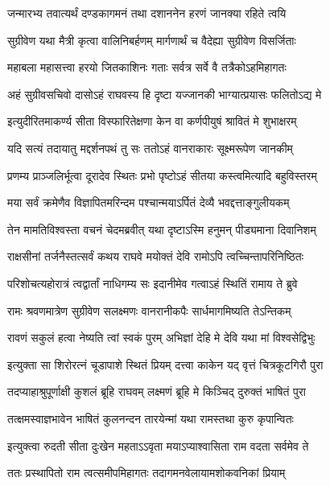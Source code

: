 \twolineshloka
{जन्मारभ्य तवात्यर्थं दण्डकागमनं तथा}
{दशाननेन हरणं जानक्या रहिते त्वयि} %

\twolineshloka
{सुग्रीवेण यथा मैत्री कृत्वा वालिनिबर्हणम्}
{मार्गणार्थं च वैदेह्या सुग्रीवेण विसर्जिताः} %

\twolineshloka
{महाबला महासत्त्वा हरयो जितकाशिनः}
{गताः सर्वत्र सर्वे वै तत्रैकोऽहमिहागतः} %

\twolineshloka
{अहं सुग्रीवसचिवो दासोऽहं राघवस्य हि}
{दृष्टा यज्जानकी भाग्यात्प्रयासः फलितोऽद्य मे} %

\twolineshloka
{इत्युदीरितमाकर्ण्य सीता विस्फारितेक्षणा}
{केन वा कर्णपीयुषं श्रावितं मे शुभाक्षरम्} %

\twolineshloka
{यदि सत्यं तदायातु मद्दर्शनपथं तु सः}
{ततोऽहं वानराकारः सूक्ष्मरूपेण जानकीम्} %

\twolineshloka
{प्रणम्य प्राञ्जलिर्भूत्वा दूरादेव स्थितः प्रभो}
{पृष्टोऽहं सीतया कस्त्वमित्यादि बहुविस्तरम्} %

\twolineshloka
{मया सर्वं क्रमेणैव विज्ञापितमरिन्दम}
{पश्चान्मयाऽर्पितं देव्यै भवद्दत्ताङ्गुलीयकम्} %

\twolineshloka
{तेन मामतिविश्वस्ता वचनं चेदमब्रवीत्}
{यथा दृष्टाऽस्मि हनुमन् पीड्यमाना दिवानिशम्} %

\twolineshloka
{राक्षसीनां तर्जनैस्तत्सर्वं कथय राघवे}
{मयोक्तं देवि रामोऽपि त्वच्चिन्तापरिनिष्ठितः} %

\twolineshloka
{परिशोचत्यहोरात्रं त्वद्वार्तां नाधिगम्य सः}
{इदानीमेव गत्वाऽहं स्थितिं रामाय ते ब्रुवे} %

\twolineshloka
{रामः श्रवणमात्रेण सुग्रीवेण सलक्ष्मणः}
{वानरानीकपैः सार्धमागमिष्यति तेऽन्तिकम्} %

\twolineshloka
{रावणं सकुलं हत्वा नेष्यति त्वां स्वकं पुरम्}
{अभिज्ञां देहि मे देवि यथा मां विश्वसेद्विभुः} %

\twolineshloka
{इत्युक्ता सा शिरोरत्नं चूडापाशे स्थितं प्रियम्}
{दत्त्वा काकेन यद् वृत्तं चित्रकूटगिरौ पुरा} %

\twolineshloka
{तदप्याहाश्रुपूर्णाक्षी कुशलं ब्रूहि राघवम्}
{लक्ष्मणं ब्रूहि मे किञ्चिद् दुरुक्तं भाषितं पुरा} %

\twolineshloka
{तत्क्षमस्वाज्ञभावेन भाषितं कुलनन्दन}
{तारयेन्मां यथा रामस्तथा कुरु कृपान्वितः} %

\twolineshloka
{इत्युक्त्वा रुदती सीता दुःखेन महताऽऽवृता}
{मयाऽप्याश्वासिता राम वदता सर्वमेव ते} %

\twolineshloka
{ततः प्रस्थापितो राम त्वत्समीपमिहागतः}
{तदागमनवेलायामशोकवनिकां प्रियाम्} %

